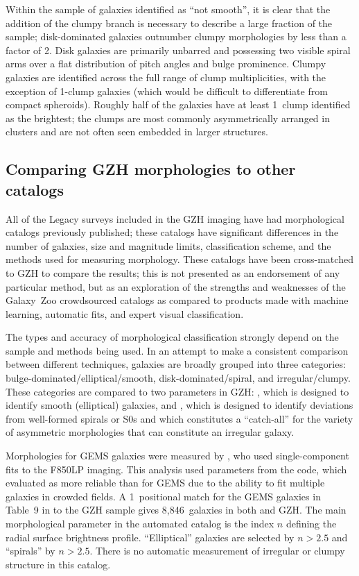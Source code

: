 \documentclass[twocolumn]{aastex6}
\begin{document}
Within the sample of galaxies identified as ``not smooth'', it is clear that
the addition of the clumpy branch is necessary to describe a large fraction of
the sample; disk-dominated galaxies outnumber clumpy morphologies by less than
a factor of 2. Disk galaxies are primarily unbarred \citet{mel14} and
possessing two visible spiral arms over a flat distribution of pitch angles and
bulge prominence. Clumpy galaxies are identified across the full range of clump
multiplicities, with the exception of 1-clump galaxies (which would be
difficult to differentiate from compact spheroids). Roughly half of the
galaxies have at least 1~clump identified as the brightest; the clumps are most
commonly asymmetrically arranged in clusters and are not often seen embedded in
larger structures. 

\subsection{Comparing GZH morphologies to other catalogs}\label{ssec:comparisons}

All of the Legacy surveys included in the GZH imaging have had morphological
catalogs previously published; these catalogs have significant differences in
the number of galaxies, size and magnitude limits, classification scheme, and
the methods used for measuring morphology. These catalogs have been
cross-matched to GZH to compare the results; this is not presented as an
endorsement of any particular method, but as an exploration of the strengths
and weaknesses of the Galaxy~Zoo crowdsourced catalogs as compared to products made
with machine learning, automatic fits, and expert visual classification. 

The types and accuracy of morphological classification strongly depend on the
sample and methods being used. In an attempt to make a consistent comparison
between different techniques, galaxies are broadly grouped into three
categories: bulge-dominated/elliptical/smooth, disk-dominated/spiral, and
irregular/clumpy. These categories are compared to two parameters in GZH:
\fbest, which is designed to identify smooth (elliptical) galaxies, and \fodd,
which is designed to identify deviations from well-formed spirals or S0s and
which constitutes a ``catch-all'' for the variety of asymmetric morphologies
that can constitute an irregular galaxy. 

Morphologies for GEMS galaxies were measured by \citet{hau07}, who used
single-component \sersic{} fits to the F850LP imaging. This analysis used
parameters from the \galfit{} code, which \citet{hau07} evaluated as more
reliable than \gimtwod{} for GEMS due to the ability to fit multiple galaxies
in crowded fields. A 1\arcsec~positional match for the GEMS galaxies in Table~9
in \citet{hau07} to the GZH sample gives 8,846~galaxies in both \citet{hau07}
and GZH. The main morphological parameter in the automated catalog is the
\sersic{} index $n$ defining the radial surface brightness profile.
``Elliptical'' galaxies are selected by $n>2.5$ and ``spirals''  by $n>2.5$.
There is no automatic measurement of irregular or clumpy structure in this
catalog. 
\end{document}
